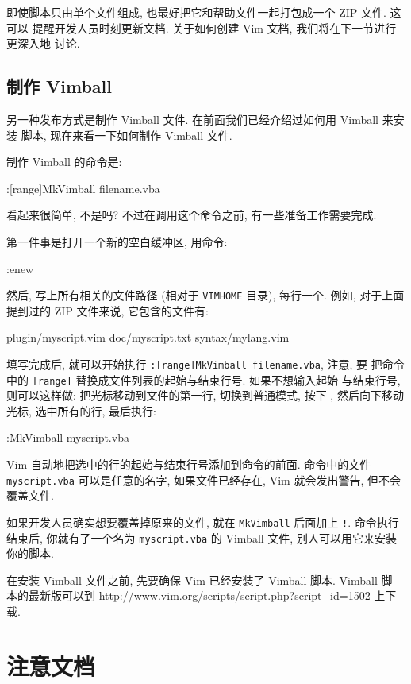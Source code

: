 即使脚本只由单个文件组成, 也最好把它和帮助文件一起打包成一个 ZIP 文件. 这可以
提醒开发人员时刻更新文档. 关于如何创建 Vim 文档, 我们将在下一节进行更深入地
讨论.

\subsection{制作 Vimball}
\label{subsec:making_vimball}

另一种发布方式是制作 Vimball 文件. 在前面我们已经介绍过如何用 Vimball 来安装
脚本, 现在来看一下如何制作 Vimball 文件.

制作 Vimball 的命令是:
\begin{vimcode}
:[range]MkVimball filename.vba
\end{vimcode}
看起来很简单, 不是吗? 不过在调用这个命令之前, 有一些准备工作需要完成.

第一件事是打开一个新的空白缓冲区, 用命令:
\begin{vimcode}
:enew
\end{vimcode}
然后, 写上所有相关的文件路径 (相对于 \texttt{VIMHOME} 目录), 每行一个. 例如,
对于上面提到过的 ZIP 文件来说, 它包含的文件有:
\begin{vimcode}
plugin/myscript.vim
doc/myscript.txt
syntax/mylang.vim
\end{vimcode}
填写完成后, 就可以开始执行 \texttt{:[range]MkVimball filename.vba}, 注意, 要
把命令中的 \texttt{[range]} 替换成文件列表的起始与结束行号. 如果不想输入起始
与结束行号, 则可以这样做: 把光标移动到文件的第一行, 切换到普通模式, 按下
, 然后向下移动光标, 选中所有的行, 最后执行:
\begin{vimcode}
:MkVimball myscript.vba
\end{vimcode}
Vim 自动地把选中的行的起始与结束行号添加到命令的前面. 命令中的文件
\texttt{myscript.vba} 可以是任意的名字, 如果文件已经存在, Vim 就会发出警告,
但不会覆盖文件.

如果开发人员确实想要覆盖掉原来的文件, 就在 \texttt{MkVimball} 后面加上
\texttt{!}. 命令执行结束后, 你就有了一个名为 \texttt{myscript.vba} 的 Vimball
文件, 别人可以用它来安装你的脚本.

\begin{warning}
    在安装 Vimball 文件之前, 先要确保 Vim 已经安装了 Vimball 脚本. Vimball 脚
    本的最新版可以到 \url{http://www.vim.org/scripts/script.php?script_id=1502}
    上下载.
\end{warning}

\section{注意文档}
\label{sec:remember_the_documentation}

